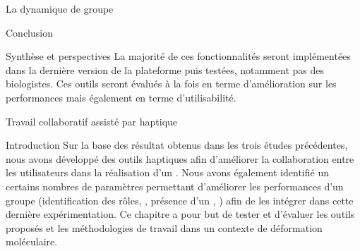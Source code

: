 \documentclass[myfrancais,ngerman,english,french]{mythesis}
\begin{document}
\begin{mychapter}{La dynamique de groupe}
\begin{mysection}{Conclusion}
\begin{mysubsection}{Synthèse et perspectives}
				La majorité de ces fonctionnalités seront implémentées dans la dernière version de la plateforme puis testées, notamment pas des biologistes.
				Ces outils seront évalués à la fois en terme d'amélioration sur les performances mais également en terme d'utilisabilité.
			\end{mysubsection}
		\end{mysection}
	\end{mychapter}
	\begin{mychapter}{Travail collaboratif assisté par haptique}
		\begin{mysection}{Introduction}
			Sur la base des résultat obtenus dans les trois études précédentes, nous avons développé des outils haptiques afin d'améliorer la collaboration entre les utilisateurs dans la réalisation d'un .
			Nous avons également identifié un certains nombres de paramètres permettant d'améliorer les performances d'un groupe (identification des rôles, \mybrainstorming, présence d'un , \myetc) afin de les intégrer dans cette dernière expérimentation.
			Ce chapitre a pour but de tester et d'évaluer les outils proposés et les méthodologies de travail dans un contexte de déformation moléculaire.


\end{mysection}
\end{mychapter}
\end{document}

